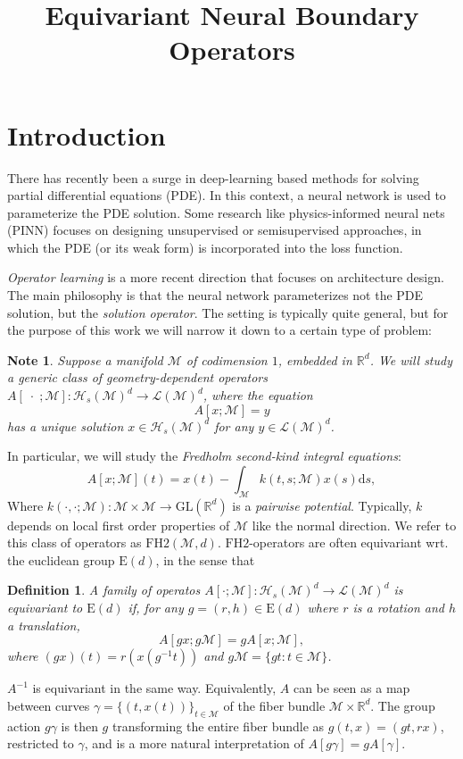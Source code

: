 \documentclass{article}
\title{Equivariant Neural Boundary Operators}
\date{}
\newtheorem{note}{Note}
\newtheorem{definition}{Definition}
\newcommand{\manifold}{\mathcal{M}}
\newcommand{\Rn}[1]{\mathbb{R}^{#1}}
\newcommand{\Ltwo}{\mathcal{L}}
\newcommand{\sobolev}{\mathcal{H}}
\newcommand{\dif}[1]{\mathrm{d}#1}
\newcommand{\fhtwo}{\mathrm{FH2}}
\newcommand{\euclid}[1]{\mathrm{E}(#1)}
\newcommand{\GL}[1]{\mathrm{GL}(\Rn{#1})}
\begin{document}
    \maketitle


    \section{Introduction}
    There has recently been a surge in deep-learning based methods for solving partial differential equations (PDE). In this context, a neural network is used to parameterize the PDE solution. Some research like physics-informed neural nets (PINN) focuses on designing unsupervised or semisupervised approaches, in which the PDE (or its weak form) is incorporated into the loss function. 
    
    \emph{Operator learning} is a more recent direction that focuses on architecture design. The main philosophy is that the neural network parameterizes not the PDE solution, but the \emph{solution operator}. The setting is typically quite general, but for the purpose of this work we will narrow it down to a certain type of problem:
    \begin{note}
        Suppose a manifold $\manifold$ of codimension $1$, embedded in $\Rn{d}$. We will study a generic class of geometry-dependent operators $A[\;\cdot\; ;\manifold]\colon \sobolev_s(\manifold)^d\to\Ltwo(\manifold)^d$, where the equation
        \[
            A[x;\manifold] = y
        \]    
        has a unique solution $x\in \sobolev_s(\manifold)^d$ for any $y\in \Ltwo(\manifold)^d$. 
    \end{note}
    In particular, we will study the \emph{Fredholm second-kind integral equations}:
    \[
        A[x; \manifold](t) = x(t) - \int_\manifold k(t,s; \manifold)x(s)\dif{s},
    \]
    Where $k(\cdot,\cdot;\manifold)\colon \manifold\times \manifold\to \GL{d}$ is a \emph{pairwise potential}. Typically, $k$ depends on local first order properties of $\manifold$ like the normal direction. We refer to this class of operators as $\fhtwo(\manifold,d)$. $\fhtwo$-operators are often equivariant wrt. the euclidean group $\euclid{d}$, in the sense that
    \begin{definition}
        A family of operatos $A[\cdot; \manifold]\colon\sobolev_s(\manifold)^d\to\Ltwo(\manifold)^d$ is equivariant to $\euclid{d}$ if, for any $g=(r,h)\in \euclid{d}$ where $r$ is a rotation and $h$ a translation, 
        \[  
            A[gx; g\manifold] = gA[x; \manifold],
        \]
        where $(gx)(t) = r(x(g^{-1}t))$ and $g\manifold=\{gt\colon t\in \manifold\}$.
    \end{definition} 
    $A^{-1}$ is equivariant in the same way. Equivalently, $A$ can be seen as a map between curves $\gamma = \{(t,x(t))\}_{t\in\manifold}$ of the fiber bundle $\manifold\times \Rn{d}$. The group action $g\gamma$ is then $g$ transforming the entire fiber bundle as $g(t,x) = (gt, rx)$, restricted to $\gamma$, and is a more natural interpretation of $A[g\gamma]=gA[\gamma]$.
\end{document}
